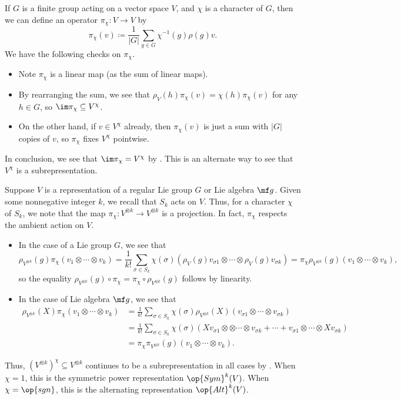 \documentclass[../notes.tex]{subfiles}
\begin{document}
\begin{remark}
	If $G$ is a finite group acting on a vector space $V$, and $\chi$ is a character of $G$, then we can define an operator $\pi_\chi\colon V\to V$ by
	\[\pi_\chi(v)\coloneqq\frac1{\left|G\right|}\sum_{g\in G}\chi^{-1}(g)\rho(g)v.\]
	We have the following checks on $\pi_\chi$.
	\begin{itemize}
		\item Note $\pi_\chi$ is a linear map (as the sum of linear maps).
		\item By rearranging the sum, we see that $\rho_V(h)\pi_\chi(v)=\chi(h)\pi_\chi(v)$ for any $h\in G$, so $\im\pi_\chi\subseteq V^\chi$.
		\item On the other hand, if $v\in V^\chi$ already, then $\pi_\chi(v)$ is just a sum with $\left|G\right|$ copies of $v$, so $\pi_\chi$ fixes $V^\chi$ pointwise.
	\end{itemize}
	In conclusion, we see that $\im\pi_\chi=V^\chi$ by . This is an alternate way to see that $V^\chi$ is a subrepresentation.
\end{remark}
\begin{example}
	Suppose $V$ is a representation of a regular Lie group $G$ or Lie algebra $\mf g$. Given some nonnegative integer $k$, we recall that $S_k$ acts on $V$. Thus, for a character $\chi$ of $S_k$, we note that the map $\pi_\chi\colon V^{\otimes k}\to V^{\otimes k}$ is a projection. In fact, $\pi_\chi$ respects the ambient action on $V$.
	\begin{itemize}
		\item In the case of a Lie group $G$, we see that
		\[\rho_{V^{\otimes k}}(g)\pi_\chi(v_1\otimes\cdots\otimes v_k)=\frac1{k!}\sum_{\sigma\in S_k}\chi(\sigma)(\rho_V(g)v_{\sigma1}\otimes\cdots\otimes\rho_V(g)v_{\sigma k})=\pi_\chi\rho_{V^{\otimes k}}(g)(v_1\otimes\cdots\otimes v_k),\]
		so the equality $\rho_{V^{\otimes k}}(g)\circ\pi_\chi=\pi_\chi\circ\rho_{V^{\otimes k}}(g)$ follows by linearity.
		\item In the case of Lie algebra $\mf g$, we see that
		\begin{align*}
			\rho_{V^{\otimes k}}(X)\pi_\chi(v_1\otimes\cdots\otimes v_k) &= \frac1{k!}\sum_{\sigma\in S_k}\chi(\sigma)\rho_{V^{\otimes k}}(X)(v_{\sigma1}\otimes\cdots\otimes v_{\sigma k}) \\
			&= \frac1{k!}\sum_{\sigma\in S_k}\chi(\sigma)(Xv_{\sigma1}\otimes \otimes\cdots\otimes v_{\sigma k}+\cdots+v_{\sigma1}\otimes\cdots\otimes Xv_{\sigma k}) \\
			&= \pi_\chi\pi_{V^{\otimes k}}(g)(v_1\otimes\cdots\otimes v_k).
		\end{align*}
	\end{itemize}
	Thus, $\left(V^{\otimes k}\right)^\chi\subseteq V^{\otimes k}$ continues to be a subrepresentation in all cases by . When $\chi=1$, this is the symmetric power representation $\op{Sym}^k(V)$. When $\chi=\op{sgn}$, this is the alternating representation $\op{Alt}^k(V)$.
\end{example}
\end{document}
